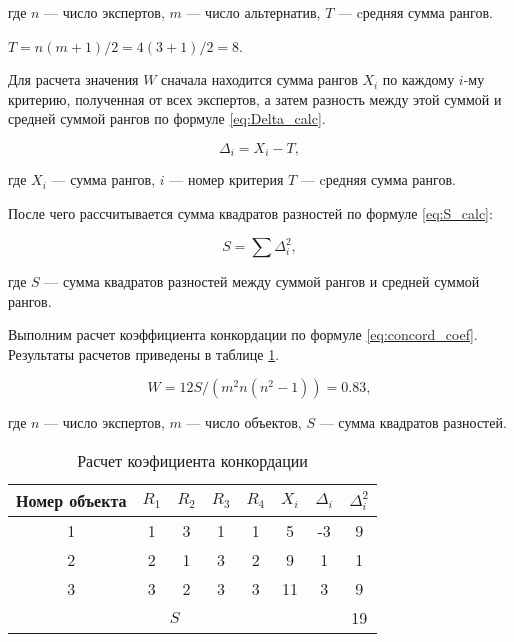 \noindent
где $n$ --- число экспертов,
$m$ --- число альтернатив, 
$T$ --- cредняя сумма рангов.

\begin{center}
    $T=n(m+1)/2 = 4(3+1)/2=8$.
\end{center}

Для расчета значения $W$ сначала находится сумма рангов $X_i$ по каждому $i$-му критерию, полученная от всех экспертов, 
а затем разность между этой суммой и средней суммой рангов по формуле \ref{eq:Delta_calc}.

\begin{equation}
    \label{eq:Delta_calc}
    \Delta_i=X_i-T,
\end{equation}
\vspace{\belowdisplayshortskip}

\noindent
где $X_i$ --- сумма рангов,
$i$ --- номер критерия 
$T$ --- cредняя сумма рангов.

После чего рассчитывается сумма квадратов разностей по формуле \ref{eq:S_calc}:

\begin{equation}
    \label{eq:S_calc}
    S=\sum{\Delta^2_i},
\end{equation}
\vspace{\belowdisplayshortskip}

\noindent
где $S$ --- сумма квадратов разностей между суммой рангов и средней суммой рангов.

Выполним расчет коэффициента конкордации по формуле \ref{eq:concord_coef}.
Результаты расчетов приведены в таблице \ref{table:experts_concord}.

\begin{equation}
    \label{eq:concord_coef}
    W = 12S/(m^2 n (n^2-1)) = 0.83,
\end{equation}

\noindent
где $n$ --- число экспертов,
$m$ --- число объектов,
$S$ --- сумма квадратов разностей.

\begin{table}[H]
    \centering
    \caption{Расчет коэфициента конкордации}\label{table:experts_concord}
    \begin{tabular}{|c|c|c|c|c|c|c|c|}
    \hline Номер объекта & $R_1$ & $R_2$ & $R_3$ & $R_4$ & $X_i$ & $\Delta_i$ & $\Delta^2_i$ \\
    \hline 1 & 1 & 3 & 1 & 1  & 5 & -3 & 9 \\
    \hline 2 & 2 & 1 & 3 &  2 & 9 & 1 & 1 \\
    \hline 3 & 3 & 2 & 3 & 3 & 11 & 3 & 9 \\
    \hline \multicolumn{7}{|c|}{$S$} & 19 \\
    \hline
    \end{tabular}
\end{table}

